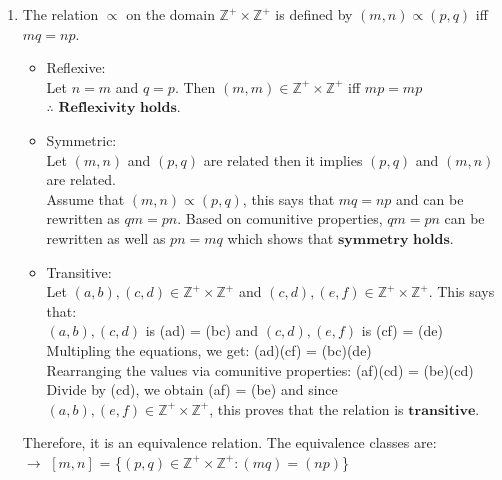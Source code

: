 \documentclass{article}
\newcommand{\Z}{\mathbb{Z}}
\begin{document}
\begin{enumerate}
\begin{enumerate}
    \item The relation $\varpropto$ on the domain $\Z^+\times\Z^+$ is defined by $(m,n) \varpropto (p,q)$ iff $mq = np$.
    \begin{itemize}
        \item Reflexive:\\Let $n = m$ and $q = p$. Then $(m,m) \in \Z^+\times\Z^+$ iff $mp = mp$\\$\therefore$ $\textbf{Reflexivity holds.}$\\
        \item Symmetric:\\Let $(m,n)$ and $(p,q)$ are related then it implies $(p,q)$ and $(m,n)$ are related.\\Assume that $(m,n) \varpropto (p,q)$,
        this says that $mq = np$ and can be rewritten as $qm = pn$. Based on comunitive properties, $qm = pn$ can be rewritten as well as $pn = mq$ 
        which shows that $\textbf{symmetry holds}$.\\
        \item Transitive:\\ Let $(a,b), (c,d) \in \Z^+\times\Z^+$ and $(c,d), (e,f) \in \Z^+\times\Z^+$. This says that:\\ $(a,b), (c,d)$ is (ad) = (bc) and $(c,d), (e,f)$ is (cf) = (de)\\
        Multipling the equations, we get: (ad)(cf) = (bc)(de)\\
        Rearranging the values via comunitive properties: (af)(cd) = (be)(cd)\\
        Divide by (cd), we obtain (af) = (be) and since $(a,b), (e,f) \in \Z^+\times\Z^+$, this proves 
        that the relation is $\textbf{transitive}$.
    \end{itemize}
Therefore, it is an equivalence relation. The equivalence classes are:\\
$\rightarrow$ $[m,n]$ = \{$(p,q) \in \Z^+\times\Z^+:(mq)=(np)$\}\\

\end{enumerate}

\end{enumerate}
\end{document}
